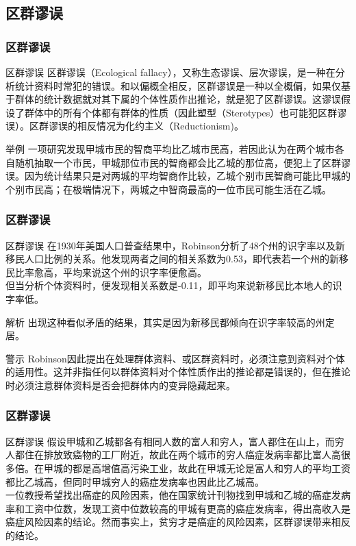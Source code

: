 \subsection{区群谬误}
\begin{frame}
  \frametitle{区群谬误}
  \begin{block}{区群谬误}
    区群谬误（Ecological fallacy），又称生态谬误、层次谬误，是一种在分析统计资料时常犯的错误。和以偏概全相反，区群谬误是一种以全概偏，如果仅基于群体的统计数据就对其下属的个体性质作出推论，就是犯了区群谬误。这谬误假设了群体中的所有个体都有群体的性质（因此塑型（Sterotypes）也可能犯区群谬误）。区群谬误的相反情况为化约主义（Reductionism)。
  \end{block}
  \pause
  \begin{block}{举例}
一项研究发现甲城市民的智商平均比乙城市民高，若因此认为在两个城市各自随机抽取一个市民，甲城那位市民的智商都会比乙城的那位高，便犯上了区群谬误。因为统计结果只是对两城的平均智商作比较，乙城个别市民智商可能比甲城的个别市民高；在极端情况下，两城之中智商最高的一位市民可能生活在乙城。
  \end{block}
\end{frame}

\begin{frame}
  \frametitle{区群谬误}
  \begin{block}{区群谬误}
在1930年美国人口普查结果中，Robinson分析了48个州的识字率以及新移民人口比例的关系。他发现两者之间的相关系数为0.53，即代表若一个州的新移民比率愈高，平均来说这个州的识字率便愈高。\\
\vspace{0.5em}
但当分析个体资料时，便发现相关系数是-0.11，即平均来说新移民比本地人的识字率低。\\
  \end{block}
  \pause \pause \pause \pause
  \begin{block}{解析}
出现这种看似矛盾的结果，其实是因为新移民都倾向在识字率较高的州定居。
  \end{block}
  \pause
  \begin{block}{警示}
Robinson因此提出在处理群体资料、或区群资料时，必须注意到资料对个体的适用性。这并非指任何以群体资料对个体性质作出的推论都是错误的，但在推论时必须注意群体资料是否会把群体内的变异隐藏起来。
  \end{block}
\end{frame}

\begin{frame}
  \frametitle{区群谬误}
  \begin{block}{区群谬误}
假设甲城和乙城都各有相同人数的富人和穷人，富人都住在山上，而穷人都住在排放致癌物的工厂附近，故此在两个城市的穷人癌症发病率都比富人高很多倍。在甲城的都是高增值高污染工业，故此在甲城无论是富人和穷人的平均工资都比乙城高，但同时甲城穷人的癌症发病率也因此比乙城高。\\
\vspace{1em}
一位教授希望找出癌症的风险因素，他在国家统计刊物找到甲城和乙城的癌症发病率和工资中位数，发现工资中位数较高的甲城有更高的癌症发病率，得出高收入是癌症风险因素的结论。然而事实上，贫穷才是癌症的风险因素，区群谬误带来相反的结论。
  \end{block}
\end{frame}

